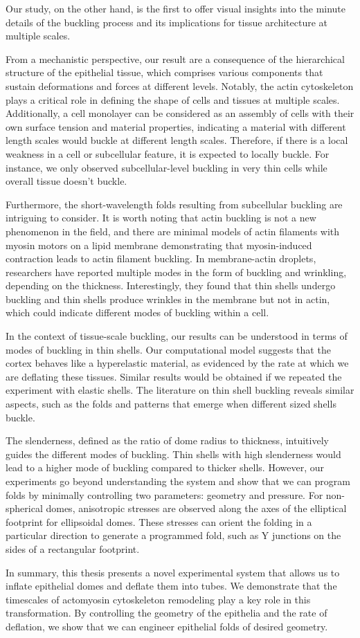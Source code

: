 Our study, on the other hand, is the first to offer visual insights into
the minute details of the buckling process and its implications for
tissue architecture at multiple scales.

From a mechanistic perspective, our result are a consequence of the
hierarchical structure of the epithelial tissue, which comprises various
components that sustain deformations and forces at different levels.
Notably, the actin cytoskeleton plays a critical role in defining the
shape of cells and tissues at multiple scales. Additionally, a cell
monolayer can be considered as an assembly of cells with their own
surface tension and material properties, indicating a material with
different length scales would buckle at different length scales.
Therefore, if there is a local weakness in a cell or subcellular
feature, it is expected to locally buckle. For instance, we only
observed subcellular-level buckling in very thin cells while overall
tissue doesn't buckle.

Furthermore, the short-wavelength folds resulting from subcellular
buckling are intriguing to consider. It is worth noting that actin
buckling is not a new phenomenon in the field, and there are minimal
models of actin filaments with myosin motors on a lipid membrane
demonstrating that myosin-induced contraction leads to actin filament
buckling. In membrane-actin droplets, researchers have reported multiple
modes in the form of buckling and wrinkling, depending on the thickness.
Interestingly, they found that thin shells undergo buckling and thin
shells produce wrinkles in the membrane but not in actin, which could
indicate different modes of buckling within a cell.

In the context of tissue-scale buckling, our results can be understood
in terms of modes of buckling in thin shells. Our computational model
suggests that the cortex behaves like a hyperelastic material, as
evidenced by the rate at which we are deflating these tissues. Similar
results would be obtained if we repeated the experiment with elastic
shells. The literature on thin shell buckling reveals similar aspects,
such as the folds and patterns that emerge when different sized shells
buckle.

The slenderness, defined as the ratio of dome radius to thickness,
intuitively guides the different modes of buckling. Thin shells with
high slenderness would lead to a higher mode of buckling compared to
thicker shells. However, our experiments go beyond understanding the
system and show that we can program folds by minimally controlling two
parameters: geometry and pressure. For non-spherical domes, anisotropic
stresses are observed along the axes of the elliptical footprint for
ellipsoidal domes. These stresses can orient the folding in a particular
direction to generate a programmed fold, such as Y junctions on the
sides of a rectangular footprint.

In summary, this thesis presents a novel experimental system that allows
us to inflate epithelial domes and deflate them into tubes. We
demonstrate that the timescales of actomyosin cytoskeleton remodeling
play a key role in this transformation. By controlling the geometry of
the epithelia and the rate of deflation, we show that we can engineer
epithelial folds of desired geometry.